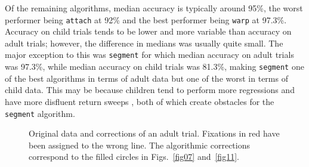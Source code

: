 \documentclass[doc,biblatex]{apa7}
\begin{document}
Of the remaining algorithms, median accuracy is typically around 95\%, the worst performer being \texttt{attach} at 92\% and the best performer being \texttt{warp} at 97.3\%. Accuracy on child trials tends to be lower and more variable than accuracy on adult trials; however, the difference in medians was usually quite small. The major exception to this was \texttt{segment} for which median accuracy on adult trials was 97.3\%, while median accuracy on child trials was 81.3\%, making \texttt{segment} one of the best algorithms in terms of adult data but one of the worst in terms of child data. This may be because children tend to perform more regressions \parencite[e.g.,][]{BlytheJoseph:2011} and have more disfluent return sweeps \parencite[e.g.,][]{Parker:2019}, both of which create obstacles for the \texttt{segment} algorithm.

	\begin{figure}
	\vspace*{2pt}
	\caption{Original data and corrections of an adult trial. Fixations in red have been assigned to the wrong line. The algorithmic corrections correspond to the filled circles in Figs.~\ref{fig07} and~\ref{fig11}.}
	\label{fig08}
	\end{figure}
\end{document}
